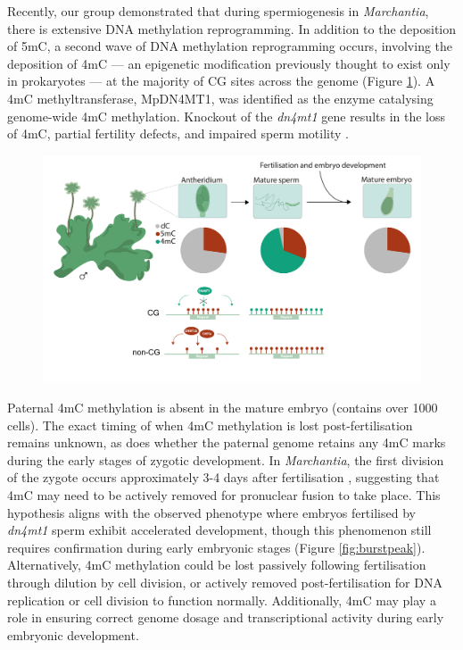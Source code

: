 Recently, our group demonstrated that during spermiogenesis in \textit{Marchantia}, there is extensive DNA methylation reprogramming. In addition to the deposition of 5mC, a second wave of DNA methylation reprogramming occurs, involving the deposition of 4mC — an epigenetic modification previously thought to exist only in prokaryotes — at the majority of CG sites across the genome (Figure \ref{fig:Mp_graphical_abstract}). A 4mC methyltransferase, MpDN4MT1, was identified as the enzyme catalysing genome-wide 4mC methylation. Knockout of the \textit{dn4mt1} gene results in the loss of 4mC, partial fertility defects, and impaired sperm motility \cite{RN189}.

\begin{figure}[htbp!] 
\centering    
    \includegraphics[width=1\textwidth]{Chapter3/Figs/Intro/Graphical_abstract.pdf}
\caption{}
\label{fig:Mp_graphical_abstract}
\captionsetup{font=small}
    \caption*{}
\end{figure}

Paternal 4mC methylation is absent in the mature embryo (contains over 1000 cells). The exact timing of when 4mC methylation is lost post-fertilisation remains unknown, as does whether the paternal genome retains any 4mC marks during the early stages of zygotic development. In \textit{Marchantia}, the first division of the zygote occurs approximately 3-4 days after fertilisation \cite{RN139}, suggesting that 4mC may need to be actively removed for pronuclear fusion to take place. This hypothesis aligns with the observed phenotype where embryos fertilised by \textit{dn4mt1} sperm exhibit accelerated development, though this phenomenon still requires confirmation during early embryonic stages (Figure \ref{fig:burstpeak}). Alternatively, 4mC methylation could be lost passively following fertilisation through dilution by cell division, or actively removed post-fertilisation for DNA replication or cell division to function normally. Additionally, 4mC may play a role in ensuring correct genome dosage and transcriptional activity during early embryonic development.


